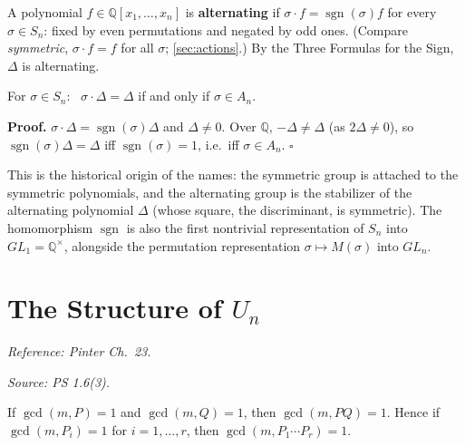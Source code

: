 \documentclass[11pt]{report}
\newcommand{\sgn}{\operatorname{sgn}}
\renewenvironment{proof}[1][Proof]{\noindent\textbf{#1.} }{\hfill$\square$\par\vspace{5pt}}
\begin{document}
\begin{defbox}\label{def:alternating-polynomial}
A polynomial $f \in \mathbb{Q}[x_1, \ldots, x_n]$ is \textbf{alternating} if $\sigma \cdot f = \sgn(\sigma) f$ for every $\sigma \in S_n$: fixed by even permutations and negated by odd ones. (Compare \emph{symmetric}, $\sigma \cdot f = f$ for all $\sigma$; \ref{sec:actions}.) By the Three Formulas for the Sign, $\Delta$ is alternating.
\end{defbox}

\begin{corbox}\label{cor:an-stabilizer-delta}
For $\sigma \in S_n$: \ $\sigma \cdot \Delta = \Delta$ if and only if $\sigma \in A_n$.
\end{corbox}

\begin{proof}
$\sigma \cdot \Delta = \sgn(\sigma)\Delta$ and $\Delta \neq 0$. Over $\mathbb{Q}$, $-\Delta \neq \Delta$ (as $2\Delta \neq 0$), so $\sgn(\sigma)\Delta = \Delta$ iff $\sgn(\sigma) = 1$, i.e.\ iff $\sigma \in A_n$.
\end{proof}

\begin{rembox}\label{rem:origin-names}
This is the historical origin of the names: the symmetric group is attached to the symmetric polynomials, and the alternating group is the stabilizer of the alternating polynomial $\Delta$ (whose square, the discriminant, is symmetric). The homomorphism $\sgn$ is also the first nontrivial representation of $S_n$ into $GL_1 = \mathbb{Q}^\times$, alongside the permutation representation $\sigma \mapsto M(\sigma)$ into $GL_n$.
\end{rembox}

\section{\texorpdfstring{The Structure of $U_n$}{The Structure of Uₙ}}\label{sec:un-structure}

\textit{Reference: Pinter Ch.\ 23.}

\textit{Source: PS 1.6(3).}

\begin{lembox}\label{lem:coprime-each-factor-coprime-product}
If $\gcd(m, P) = 1$ and $\gcd(m, Q) = 1$, then $\gcd(m, PQ) = 1$. Hence if $\gcd(m, P_i) = 1$ for $i = 1, \ldots, r$, then $\gcd(m, P_1 \cdots P_r) = 1$.
\end{lembox}
\end{document}
